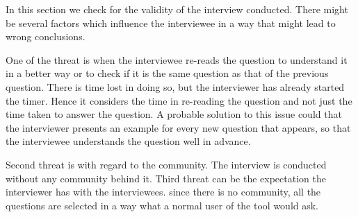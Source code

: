 In this section we check for the validity of the interview conducted. There might be several factors which influence the interviewee in a way that might lead to wrong conclusions.

One of the threat is when the interviewee re-reads the question to understand it in a better way or to check if it is the same question as that of the previous question. There is time lost in doing so, but the interviewer has already started the timer. Hence it considers the time in re-reading the question and not just the time taken to answer the question. A probable solution to this issue could that the interviewer presents an example for every new question that appears, so that the interviewee understands the question well in advance. 

Second threat is with regard to the community. The interview is conducted without any community behind it. 
Third threat can be the expectation the interviewer has with the interviewees. since there is no community, all the questions are selected in a way what a normal user of the tool would ask.